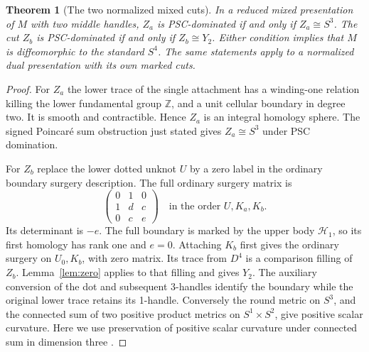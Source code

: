 \documentclass[11pt,letterpaper]{article}
\numberwithin{equation}{section}
\newtheorem{theorem}{Theorem}[section]
\theoremstyle{remark}
\newcommand{\HB}[1]{\mathcal H_{#1}}
\begin{document}
\begin{theorem}[The two normalized mixed cuts]\label{thm:mixed}
In a reduced mixed presentation of \(M\) with two middle handles,
\(Z_a\) is PSC-dominated if and only if \(Z_a\cong S^3\).
The cut \(Z_b\) is PSC-dominated if and only if \(Z_b\cong Y_2\).
Either condition implies that \(M\) is diffeomorphic to the standard
\(S^4\). The same statements apply to a normalized dual presentation
with its own marked cuts.
\end{theorem}
\begin{proof}
For \(Z_a\) the lower trace of the single attachment has a
winding-one relation killing the lower fundamental group
\(\mathbb Z\), and a unit cellular boundary in degree two.
It is smooth and contractible. Hence \(Z_a\) is an integral
homology sphere. The signed Poincar\'e sum obstruction just
stated gives \(Z_a\cong S^3\) under PSC domination.

For \(Z_b\) replace the lower dotted unknot \(U\) by a zero label
in the ordinary boundary surgery description. The full ordinary
surgery matrix is
\[
 \begin{pmatrix}0&1&0\\1&d&c\\0&c&e\end{pmatrix}
 \quad\text{in the order } U,K_a,K_b .
\]
Its determinant is \(-e\). The full boundary is marked by the
upper body \(\HB{1}\), so its first homology has rank one and
\(e=0\). Attaching \(K_b\) first gives the ordinary surgery
on \(U_0,K_b\), with zero matrix. Its trace from \(D^4\) is
a comparison filling of \(Z_b\). Lemma~\ref{lem:zero} applies
to that filling and gives \(Y_2\). The auxiliary conversion
of the dot and subsequent 3-handles identify the boundary
while the original lower trace retains its 1-handle.
Conversely the round metric on \(S^3\), and the connected sum
of two positive product metrics on \(S^1\times S^2\), give
positive scalar curvature. Here we use preservation of positive
scalar curvature under connected sum in dimension three
\cite[Theorem A]{GromovLawson1980Surgery}.


\end{proof}
\end{document}
